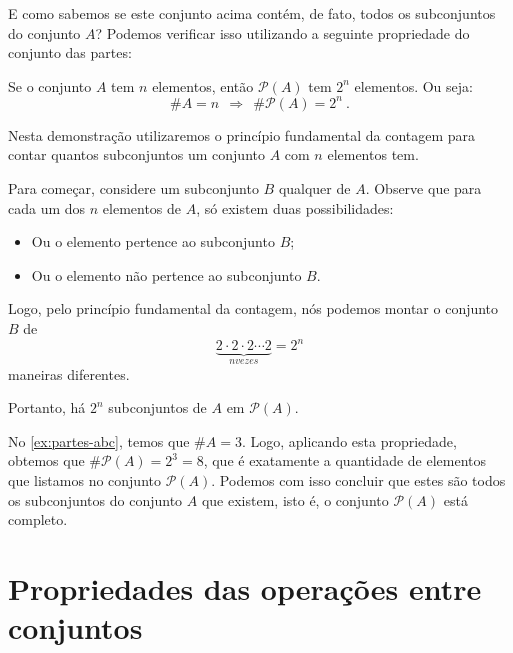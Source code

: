  E como sabemos se este conjunto acima contém, de fato, todos os subconjuntos do conjunto $A$? Podemos verificar isso utilizando a seguinte propriedade do conjunto das partes:

 \begin{prop}
  Se o conjunto $A$ tem $n$ elementos, então $\mathcal{P}(A)$ tem $2^n$ elementos. Ou seja:
\begin{equation}
\# A= n \ \ \Rightarrow \ \ \# \mathcal{P}(A)= 2^n \ .
\end{equation}
\end{prop}

 \begin{dem}
 Nesta demonstração utilizaremos o princípio fundamental da contagem para contar quantos subconjuntos um conjunto $A$ com $n$ elementos tem.

 Para começar, considere um subconjunto $B$ qualquer de $A$. Observe que para cada um dos $n$ elementos de $A$, só existem duas possibilidades:
 \begin{itemize}
 \item Ou o elemento pertence ao subconjunto $B$;
 \item Ou o elemento não pertence ao subconjunto $B$.
 \end{itemize}

 Logo, pelo princípio fundamental da contagem, nós podemos montar o conjunto $B$ de
\begin{equation}
\underbrace{2 \cdot 2 \cdot 2 \cdots 2}_{n vezes}= 2^n
\end{equation}
 maneiras diferentes.

 Portanto, há $2^n$ subconjuntos de $A$ em $\mathcal{P}(A)$.
 \end{dem}

 No \autoref{ex:partes-abc}, temos que $\# A= 3$. Logo, aplicando esta propriedade, obtemos que $\# \mathcal{P}(A)= 2^3= 8$, que é exatamente a quantidade de elementos que listamos no conjunto $\mathcal{P}(A)$. Podemos com isso concluir que estes são todos os subconjuntos do conjunto $A$ que existem, isto é, o conjunto $\mathcal{P}(A)$ está completo.



 \newpage
 \section{Propriedades das operações entre conjuntos}

